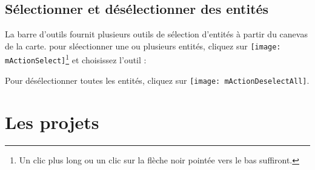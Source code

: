 \subsection{Sélectionner et désélectionner des entités}\label{sec:selection}

La barre d'outils fournit plusieurs outils de sélection d'entités à partir du canevas de la carte. pour sléectionner une ou plusieurs entités, cliquez  sur \texttt{[image: mActionSelect]}\footnote{Un clic plus long ou un clic sur la flèche noir pointée vers le bas suffiront.} et choisissez l'outil :

\begin{description}
\item {}
\item {}
\item {}
\item {}
\item {}
\end{description} 

Pour désélectionner toutes les entités, cliquez sur \texttt{[image: mActionDeselectAll]}.

\section{Les projets} \label{sec:projects} 

